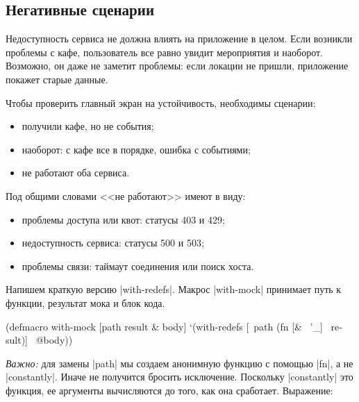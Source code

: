 \subsection{Негативные сценарии}

Недоступность сервиса не должна влиять на приложение в целом. Если возникли
проблемы с кафе, пользователь все равно увидит мероприятия и наоборот. Возможно,
он даже не заметит проблемы: если локации не пришли, приложение покажет старые
данные.

Чтобы проверить главный экран на устойчивость, необходимы сценарии:

\begin{itemize}

\item
  получили кафе, но не события;

\item
  наоборот: с кафе все в порядке, ошибка с событиями;

\item
  не работают оба сервиса.

\end{itemize}

Под общими словами <<не работают>> имеют в виду:


\begin{itemize}

\item
  проблемы доступа или квот: статусы 403 и 429;

\item
  недоступность сервиса: статусы 500 и 503;

\item
  проблемы связи: таймаут соединения или поиск хоста.

\end{itemize}

Напишем краткую версию \spverb|with-redefs|. Макрос \spverb|with-mock| принимает
путь к функции, результат мока и блок кода.

\begin{english}
  \begin{clojure}
(defmacro with-mock
  [path result & body]
  `(with-redefs
     [~path (fn [& ~'_] ~result)]
     ~@body))
  \end{clojure}
\end{english}

\emph{Важно:} для замены \spverb|path| мы создаем анонимную функцию с помощью
\spverb|fn|, а не \spverb|constantly|. Иначе не получится бросить
исключение. Поскольку \spverb|constantly| это функция, ее аргументы вычисляются
до того, как она сработает. Выражение:

